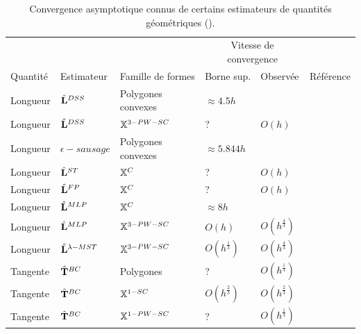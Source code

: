 \begin{table}[ht]
\centering
\caption{Convergence asymptotique connus de certains estimateurs de quantités géométriques ().}
\label{tab:tang-comp}
\begin{tabular}{@{}lp{1.9cm}lllr@{}}
\toprule
 & & & \multicolumn{2}{c}{Vitesse de convergence} &            \\ \cmidrule(r){4-5}
Quantité & Estimateur & Famille de formes & Borne sup. & Observée & Référence \\ \midrule

%
Longueur & $\hat{\mathbf{L}}^{DSS}$ & Polygones convexes & $\approx 4.5h$ & & \cite{Kovalevsky1992} \\
Longueur & $\hat{\mathbf{L}}^{DSS}$ & $\mathbb{X}^{3-PW-SC}$ & ? & $O(h)$ & \cite{Kovalevsky1992} \\
Longueur & $\epsilon-sausage$ & Polygones convexes & $\approx 5.844h$ & & \cite{Asano2001} \\
Longueur & $\hat{\mathbf{L}}^{ST}$ & $\mathbb{X}^{C}$ & ? & $O(h)$ & \cite{Coeurjolly2004} \\
Longueur & $\hat{\mathbf{L}}^{FP}$ & $\mathbb{X}^{C}$ & ? & $O(h)$ & \cite{Roussillon2011b} \\
Longueur & $\hat{\mathbf{L}}^{MLP}$ & $\mathbb{X}^{C}$ & $\approx 8h$ & & \cite{Sloboda1998} \\
Longueur & $\hat{\mathbf{L}}^{MLP}$ & $\mathbb{X}^{3-PW-SC}$ & $O(h)$ & $O(h^\frac{4}{3})$ & \cite{Sloboda1998} \\
Longueur & $\hat{\mathbf{L}}^{\lambda-MST}$ & $\mathbb{X}^{3-PW-SC}$ & $O(h^\frac{1}{3})$ & $O(h^\frac{4}{3})$ & \cite{Lachaud2006HDR} \\

Tangente & $\hat{\mathbf{T}}^{BC}$ & Polygones & ? & $O(h^\frac{1}{3})$ & \cite{Coeurjolly_ChapEstimateur} \\
Tangente & $\hat{\mathbf{T}}^{BC}$ & $\mathbb{X}^{1-SC}$ & $O(h^\frac{2}{3})$ & $O(h^\frac{2}{3})$ & \cite{Malgouyres2008} \\
Tangente & $\hat{\mathbf{T}}^{BC}$ & $\mathbb{X}^{1-PW-SC}$ & ? & $O(h^\frac{1}{3})$ & \cite{Coeurjolly_ChapEstimateur} \\


\end{tabular}
\end{table}
